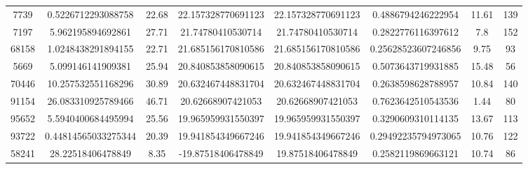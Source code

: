 \documentclass[14pt]{article} %
\begin{document}
\begin{landscape}
\begin{spacing}{1.0}
\begin{table}[h]
\begin{tabular}{|c|c|c|c|c|c|c|c|}
7739&0.5226712293088758&22.68&22.157328770691123&22.157328770691123&0.4886794246222954&11.61&139\\
7197&5.962195894692861&27.71&21.74780410530714&21.74780410530714&0.2822776116397612&7.8&152\\
68158&1.0248438291894155&22.71&21.685156170810586&21.685156170810586&0.25628523607246856&9.75&93\\
5669&5.099146141909381&25.94&20.840853858090615&20.840853858090615&0.5073643719931885&15.48&56\\
70446&10.257532551168296&30.89&20.632467448831704&20.632467448831704&0.2638598628788957&10.84&140\\
91154&26.083310925789466&46.71&20.62668907421053&20.62668907421053&0.7623642510543536&1.44&80\\
95652&5.5940400684495994&25.56&19.965959931550397&19.965959931550397&0.3290609310114135&13.67&113\\
93722&0.44814565033275344&20.39&19.941854349667246&19.941854349667246&0.29492235794973065&10.76&122\\
58241&28.22518406478849&8.35&-19.87518406478849&19.87518406478849&0.2582119869663121&10.74&86\\
\hline 
\end{tabular}
\end{table}

\newpage


\end{spacing}
\end{landscape}
\end{document}
